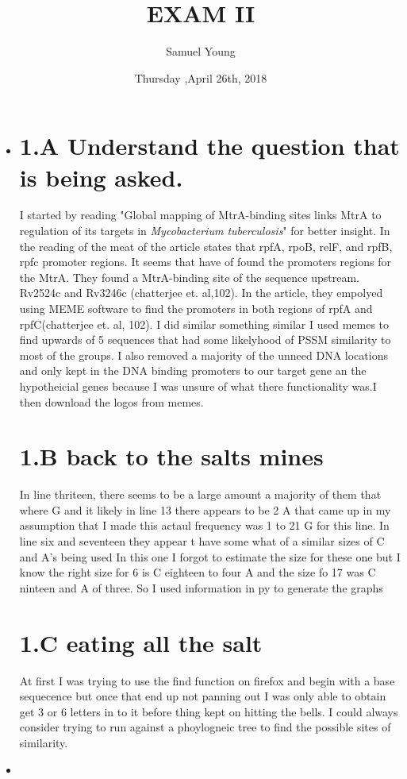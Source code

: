 \documentclass[12pt]{article}
\author{Samuel Young}
\title{EXAM  II}
\date{Thursday ,April 26th, 2018}
\begin{document}
\maketitle
\begin{itemize}
	\item
\part{1.A Understand the question that is being asked.}
  I started by reading "Global mapping of MtrA-binding sites links MtrA to regulation of its targets in \textit{Mycobacterium tuberculosis}" for better insight.  In  the reading of the meat of the article states that rpfA, rpoB, relF, and rpfB, rpfc  promoter regions. It seems that  have of found the promoters regions for  the MtrA. They found a MtrA-binding site of the sequence upstream. Rv2524c and Rv3246c (chatterjee et. al,102). In the article, they empolyed using MEME software to find the promoters in both regions of rpfA and rpfC(chatterjee et. al, 102). I did similar something similar I used memes to find upwards of 5 sequences that had some likelyhood of PSSM  similarity to most of the groups. I also removed a majority of the unneed DNA locations and only kept in the DNA binding promoters to our target gene  an the hypotheicial genes because I was unsure of what there functionality was.I then download the logos from memes. 
\part{1.B back to the salts mines}
  In line thriteen, there seems to be a large amount a majority of them that where G and it likely  in line 13 there appears to be 2 A that came up in my assumption that I made this actaul frequency was 1 to 21 G for this line. In line six and seventeen they appear t  have some what of a similar sizes  of C and A's being used  In this one I forgot to estimate the size for these one but I know the right size for 6  is  C eighteen  to four A and the size fo 17 was  C ninteen and A of three. So I used information in py to  generate the graphs
\part{1.C eating all the salt}
At first I was trying to use the find function on firefox and begin with a base sequecence but once that end up not panning out I was only able to obtain  get  3 or  6 letters in to it before thing kept on hitting the bells. I could always consider trying to run against a phoylogneic tree to find the possible sites of similarity.
	\item

\end{itemize}
\end{document}

